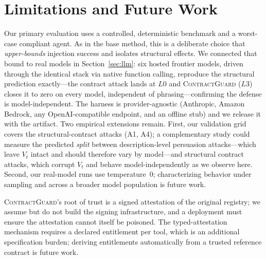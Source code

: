 \documentclass[conference,onecolumn]{IEEEtran}
\theoremstyle{definition}
\newcommand{\cg}{\textsc{ContractGuard}}
\newcommand{\Vt}{V_t}
\begin{document}
\section{Limitations and Future Work}
\label{sec:lim}
Our primary evaluation uses a controlled, deterministic benchmark and a
worst-case compliant agent. As in the base method, this is a deliberate choice
that \emph{upper-bounds} injection success and isolates structural effects. We
connected that bound to real models in Section~\ref{sec:llm}: six hosted frontier
models, driven through the identical stack via native function calling, reproduce
the structural prediction exactly---the contract attack lands at $L0$ and \cg{}
($L3$) closes it to zero on every model, independent of phrasing---confirming the
defense is model-independent. The harness is provider-agnostic (Anthropic,
Amazon Bedrock, any OpenAI-compatible endpoint, and an offline stub) and we
release it with the artifact. Two empirical extensions remain. First, our
validation grid covers the structural-contract attacks (A1, A4); a complementary
study could measure the predicted \emph{split} between description-level
persuasion attacks---which leave $\Vt$ intact and should therefore vary by
model---and structural contract attacks, which corrupt $\Vt$ and behave
model-independently as we observe here. Second, our real-model runs use
temperature~0; characterizing behavior under sampling and across a broader model
population is future work.

\cg{}'s root of trust is a signed attestation of the original registry; we
assume but do not build the signing infrastructure, and a deployment must ensure
the attestation cannot itself be poisoned. The typed-attestation mechanism
requires a declared entitlement per tool, which is an additional specification
burden; deriving entitlements automatically from a trusted reference contract is
future work.
\end{document}
